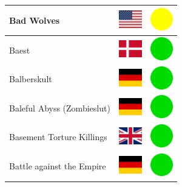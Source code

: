\documentclass[12pt, a4paper, twoside]{report}
\begin{document}
\begin{center}
\begin{longtable}{|p{5cm}|p{2cm}|p{2cm}|}
 Bad Wolves                                                 & \includegraphics[width=1cm]{../4x3/us} &   \includegraphics[width=1cm]{../likes/m} \\ \hline
 Baest                                                      & \includegraphics[width=1cm]{../4x3/dk} &   \includegraphics[width=1cm]{../likes/y} \\ \hline
 Balberskult                                                & \includegraphics[width=1cm]{../4x3/de} &   \includegraphics[width=1cm]{../likes/y} \\ \hline
 Baleful Abyss (Zombieslut)                                 & \includegraphics[width=1cm]{../4x3/de} &   \includegraphics[width=1cm]{../likes/y} \\ \hline
 Basement Torture Killings                                  & \includegraphics[width=1cm]{../4x3/gb} &   \includegraphics[width=1cm]{../likes/y} \\ \hline
 Battle against the Empire                                  & \includegraphics[width=1cm]{../4x3/de} &   \includegraphics[width=1cm]{../likes/y} \\ \hline

\end{longtable}
\end{center}
\end{document}
